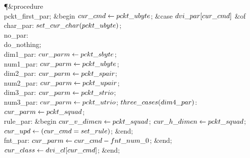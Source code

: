 \Y\P\4\&{procedure}\1\  \\{pckt\_first\_par};\2\6
\&{begin} $\\{cur\_cmd}\gets\\{pckt\_ubyte}$;\6
\&{case} $\\{dvi\_par}[\\{cur\_cmd}]$ \1\&{of}\6
\4\\{char\_par}: $\\{set\_cur\_char}(\\{pckt\_ubyte})$;\6
\4\\{no\_par}: \\{do\_nothing};\6
\4\\{dim1\_par}: $\\{cur\_parm}\gets\\{pckt\_sbyte}$;\6
\4\\{num1\_par}: $\\{cur\_parm}\gets\\{pckt\_ubyte}$;\6
\4\\{dim2\_par}: $\\{cur\_parm}\gets\\{pckt\_spair}$;\6
\4\\{num2\_par}: $\\{cur\_parm}\gets\\{pckt\_upair}$;\6
\4\\{dim3\_par}: $\\{cur\_parm}\gets\\{pckt\_strio}$;\6
\4\\{num3\_par}: $\\{cur\_parm}\gets\\{pckt\_utrio}$;\6
\4$\\{three\_cases}(\\{dim4\_par})$: $\\{cur\_parm}\gets\\{pckt\_squad}$;\6
\4\\{rule\_par}: \&{begin} $\\{cur\_v\_dimen}\gets\\{pckt\_squad}$;\5
$\\{cur\_h\_dimen}\gets\\{pckt\_squad}$;\5
$\\{cur\_upd}\gets(\\{cur\_cmd}=\\{set\_rule})$;\6
\&{end};\6
\4\\{fnt\_par}: $\\{cur\_parm}\gets\\{cur\_cmd}-\\{fnt\_num\_0}$;\2\6
\&{end};\6
$\\{cur\_class}\gets\\{dvi\_cl}[\\{cur\_cmd}]$;\6
\&{end};\par
\fi

